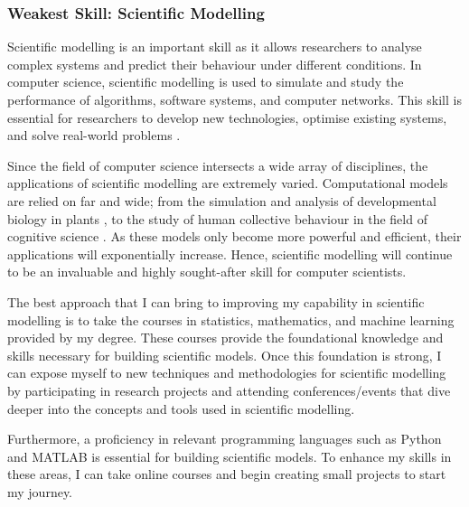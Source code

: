 \documentclass[a4paper, 11pt]{report}
\begin{document}
\subsubsection{Weakest Skill: Scientific Modelling \cite{sfia}}

Scientific modelling is an important skill as it allows researchers to analyse complex systems and predict their behaviour under different conditions. In computer science, scientific modelling is used to simulate and study the performance of algorithms, software systems, and computer networks. This skill is essential for researchers to develop new technologies, optimise existing systems, and solve real-world problems \cite{nibib}.

Since the field of computer science intersects a wide array of disciplines, the applications of scientific modelling are extremely varied. Computational models are relied on far and wide; from the simulation and analysis of developmental biology in plants \cite{plant-dev}, to the study of human collective behaviour in the field of cognitive science \cite{collective}. As these models only become more powerful and efficient, their applications will exponentially increase. Hence, scientific modelling will continue to be an invaluable and highly sought-after skill for computer scientists.

The best approach that I can bring to improving my capability in scientific modelling is to take the courses in statistics, mathematics, and machine learning provided by my degree. These courses provide the foundational knowledge and skills necessary for building scientific models. Once this foundation is strong, I can expose myself to new techniques and methodologies for scientific modelling by participating in research projects and attending conferences/events that dive deeper into the concepts and tools used in scientific modelling.

Furthermore, a proficiency in relevant programming languages such as Python and MATLAB is essential for building scientific models. To enhance my skills in these areas, I can take online courses and begin creating small projects to start my journey.
\end{document}
